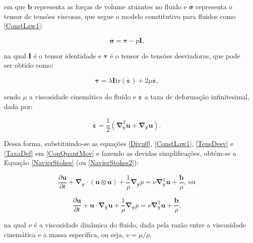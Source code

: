 \documentclass[_ArquivoPrincipal.tex]{subfiles}
\begin{document}
\noindent em que $\mathbf{b}$ representa as forças de volume atuantes no fluido e $\mathbf{\sigma}$ representa o tensor de tensões viscosas, que segue o modelo constitutivo para fluidos como \ref{ConstLaw1}:

\begin{equation}
    \mathbf{\sigma}=\mathbf{\tau}-p\mathbf{I}\text{,}
    \label{ConstLaw1}
\end{equation}

\noindent na qual $\mathbf{I}$ é o tensor identidade e $\mathbf{\tau}$ é o tensor de tensões desviadoras, que pode ser obtido como:

\begin{equation}
    \mathbf{\tau}=\lambda\mathbf{I}\textrm{tr}(\dot{\mathbf{\varepsilon}})+2\mu\dot{\mathbf{\varepsilon}}\text{,}
    \label{TensDesv}
\end{equation}

\noindent sendo $\mu$ a viscosidade cinemática do fluido e $\dot{\mathbf{\varepsilon}}$ a taxa de deformação infinitesimal, dada por:

\begin{equation}
    \dot{\mathbf{\varepsilon}}=\frac{1}{2}\left(\mathbf{\nabla}^T_\mathbf{y}\mathbf{u}+\mathbf{\nabla}_\mathbf{y}\mathbf{u}\right)\text{.}
    \label{TaxaDef}
\end{equation}

Dessa forma, substituindo-se as equações \ref{Divu0}, \ref{ConstLaw1}, \ref{TensDesv} e \ref{TaxaDef} em \ref{ConQuantMov} e fazendo as devidas simplificações, obtém-se a Equação \ref{NavierStokes} (ou \ref{NavierStokes2}):

\begin{equation}
    \frac{\partial\mathbf{u}}{\partial t}+\mathbf{\nabla}_\mathbf{y}\cdot(\mathbf{u}\otimes\mathbf{u})+\frac{1}{\rho}\mathbf{\nabla}_\mathbf{y}p=\nu\mathbf{\nabla}^2_\mathbf{y}\mathbf{u}+\frac{\mathbf{b}}{\rho}\text{, ou}
    \label{NavierStokes}
\end{equation}

\begin{equation}
    \frac{\partial\mathbf{u}}{\partial t}+\mathbf{u}\cdot\mathbf{\nabla}_\mathbf{y}\mathbf{u}+\frac{1}{\rho}\mathbf{\nabla}_\mathbf{y}p=\nu\mathbf{\nabla}^2_\mathbf{y}\mathbf{u}+\frac{\mathbf{b}}{\rho}\text{,}
    \label{NavierStokes2}
\end{equation}

\noindent na qual $\nu$ é a viscosidade dinâmica do fluido, dada pela razão entre a viscosidade cinemática e a massa específica, ou seja, $\nu=\mu/\rho$.
\end{document}
